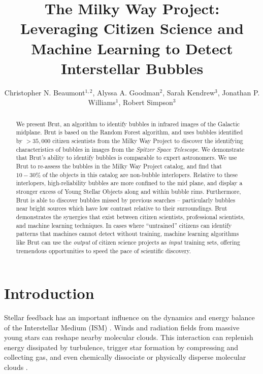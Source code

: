 \documentclass[preprint]{aastex}
\begin{document}
\title{The Milky Way Project: Leveraging Citizen Science and Machine Learning to Detect Interstellar Bubbles}

\author{Christopher N. Beaumont$^{1,2}$, Alyssa A. Goodman$^2$, Sarah Kendrew$^3$, Jonathan P. Williams$^1$, Robert Simpson$^3$}

\begin{abstract}
We present Brut, an algorithm to identify bubbles in infrared images of the Galactic midplane. Brut is based on the Random Forest algorithm, and uses bubbles identified by $>35,000$ citizen scientists from the Milky Way Project to discover the identifying characteristics of bubbles in images from the \textit{Spitzer Space Telescope}. We demonstrate that Brut's ability to identify bubbles is comparable to expert astronomers. We use Brut to re-assess the bubbles in the Milky Way Project catalog, and find that $10-30\%$ of the objects in this catalog are non-bubble interlopers. Relative to these interlopers, high-reliability bubbles are more confined to the mid plane, and display a stronger excess of Young Stellar Objects along and within bubble rims. Furthermore, Brut is able to discover bubbles missed by previous searches -- particularly bubbles near bright sources which have low contrast relative to their surroundings. Brut demonstrates the synergies that exist between citizen scientists, professional scientists, and machine learning techniques. In cases where ``untrained'' citizens can identify patterns that machines cannot detect without training, machine learning algorithms like Brut can use the \emph{output} of citizen science projects as \emph{input} training sets, offering tremendous opportunities to speed the pace of scientific discovery.
\end{abstract}

\section{Introduction}
\label{sec:intro}
Stellar feedback has an important influence on the dynamics and energy balance of the Interstellar Medium (ISM) \citep{Zinnecker07}. Winds and radiation fields from massive young stars can reshape nearby molecular clouds. This interaction can replenish energy dissipated by turbulence, trigger star formation by compressing and collecting gas, and even chemically dissociate or physically disperse molecular clouds \citep{Matzner02}.
\end{document}
